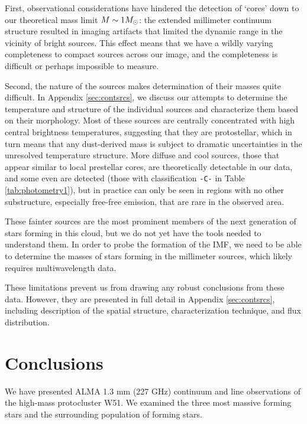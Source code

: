 \documentclass{emulateapj}
\begin{document}
First, observational considerations have hindered the detection of `cores' down
to our theoretical mass limit $M\sim1M_{\odot}$: the  extended millimeter continuum
structure resulted in imaging artifacts that limited the dynamic range in the
vicinity of bright sources.  This effect means that we have a wildly varying
completeness to compact sources across our image, and the completeness is
difficult or perhaps impossible to measure.

Second, the nature of the sources makes determination of their masses quite
difficult.  In Appendix \ref{sec:contsrcs}, we discuss our attempts to
determine the temperature and structure of the individual sources and
characterize them based on their morphology.  Most of these sources are
centrally concentrated with high central brightness temperatures, suggesting
that they are protostellar, which in turn means that any dust-derived mass is
subject to dramatic uncertainties in the unresolved temperature structure.
More diffuse and cool sources, those that appear similar to local prestellar
cores, are theoretically detectable in our data, and some even are detected
(those with classification \texttt{-C-} in Table \ref{tab:photometry1}), but in
practice can only be seen in regions with no other substructure, especially
free-free emission, that are rare in the observed area.

These fainter sources are the most prominent members of the next generation of
stars forming in this cloud, but we do not yet have the tools needed to
understand them.  In order to probe the formation of the IMF, we need to be
able to determine the masses of stars forming in the millimeter sources, which
likely requires multiwavelength data.  

These limitations prevent us from drawing any robust conclusions from these
data.  However, they are presented in full detail in Appendix
\ref{sec:contsrcs}, including description of the spatial structure,
characterization technique, and flux distribution.



\section{Conclusions}
\label{sec:conclusion}

We have presented ALMA 1.3 mm (227 GHz) continuum and line observations of the
high-mass protocluster W51.  We examined the three most massive forming stars
and the surrounding population of forming stars.  
\end{document}
